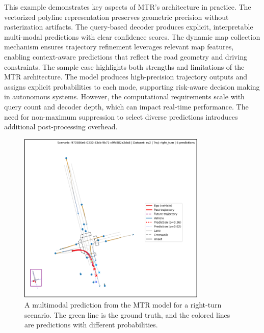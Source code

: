 This example demonstrates key aspects of MTR's architecture in practice. The vectorized polyline representation preserves geometric precision without rasterization artifacts. The query-based decoder produces explicit, interpretable multi-modal predictions with clear confidence scores. The dynamic map collection mechanism ensures trajectory refinement leverages relevant map features, enabling context-aware predictions that reflect the road geometry and driving constraints.
The sample case highlights both strengths and limitations of the MTR architecture. The model produces high-precision trajectory outputs and assigns explicit probabilities to each mode, supporting risk-aware decision making in autonomous systems. However, the computational requirements scale with query count and decoder depth, which can impact real-time performance. The need for non-maximum suppression to select diverse predictions introduces additional post-processing overhead.

\begin{figure}[htbp]
    \centering
    \includegraphics[width=0.8\textwidth]{figures/input_output_viz_ugly.png}
    \caption{A multimodal prediction from the MTR model for a right-turn scenario. The green line is the ground truth, and the colored lines are predictions with different probabilities.}
    \label{fig:mtr_prediction_merged}
\end{figure}